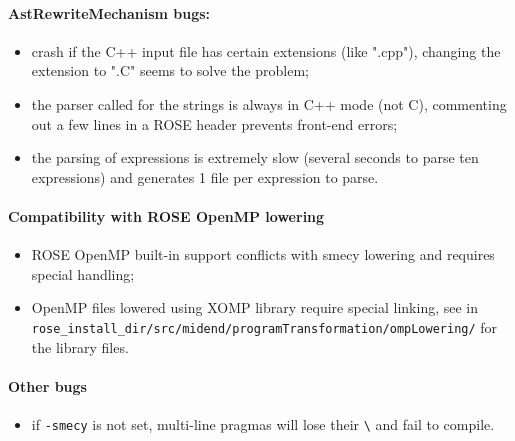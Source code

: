 \documentclass[A4]{article}
\begin{document}
		\paragraph{AstRewriteMechanism bugs:}
		\begin{itemize}
			\item crash if the C++ input file has certain extensions (like ".cpp"), changing the extension to ".C" seems to solve the problem;
			\item the parser called for the strings is always in C++ mode (not C), commenting out a few lines in a ROSE header prevents front-end errors;
			\item the parsing of expressions is extremely slow (several seconds to parse ten expressions) and generates 1 file per expression to parse.
		\end{itemize}

		\paragraph{Compatibility with ROSE OpenMP lowering}
		\begin{itemize}
			\item ROSE OpenMP built-in support conflicts with smecy lowering and requires special handling;
			\item OpenMP files lowered using XOMP library require special linking, see in \verb+rose_install_dir/src/midend/programTransformation/ompLowering/+ for the library files.
		\end{itemize}
		
		\paragraph{Other bugs}
		\begin{itemize}
			\item if \verb+-smecy+ is not set, multi-line pragmas will lose their \verb+\+ and fail to compile.
		\end{itemize}
\end{document}
